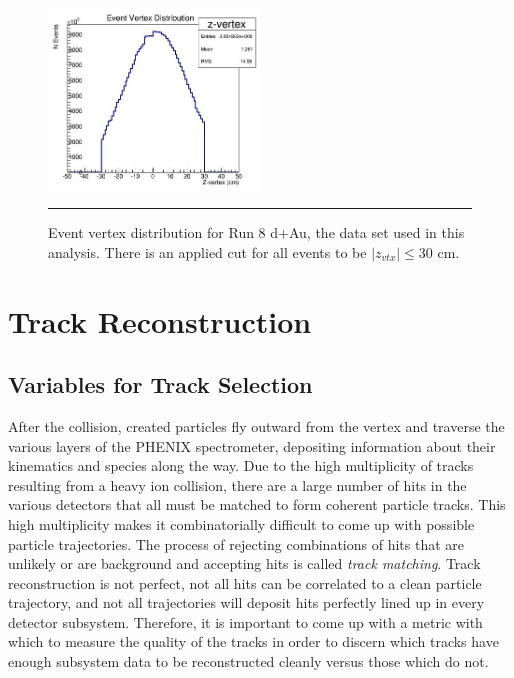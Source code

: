 \begin{figure}[htbp!]
  \centering
    \includegraphics[width=0.5\textwidth]{evtQA/zvtxdist.JPG}
    \rule{35em}{0.5pt}
  \caption[Event Vertex Distribution]{Event vertex distribution for Run 8 d+Au, the data set used in this analysis. There is an applied cut for all events to be $|z_{vtx}| \leq 30$ cm.}
  \label{fig:vtxdist}
\end{figure}

\section{Track Reconstruction}
\label{trkrecosect}
\subsection{Variables for Track Selection}
After the collision, created particles fly outward from the vertex and traverse the various layers of the PHENIX spectrometer, depositing information about their kinematics and species along the way. Due to the high multiplicity of tracks resulting from a heavy ion collision, there are a large number of hits in the various detectors that all must be matched to form coherent particle tracks. This high multiplicity makes it combinatorially difficult to come up with possible particle trajectories. The process of rejecting combinations of hits that are unlikely or are background and accepting hits is called \textit{track matching}. Track reconstruction is not perfect, not all hits can be correlated to a clean particle trajectory, and not all trajectories will deposit hits perfectly lined up in every detector subsystem. Therefore, it is important to come up with a metric with which to measure the quality of the tracks in order to discern which tracks have enough subsystem data to be reconstructed cleanly versus those which do not.

